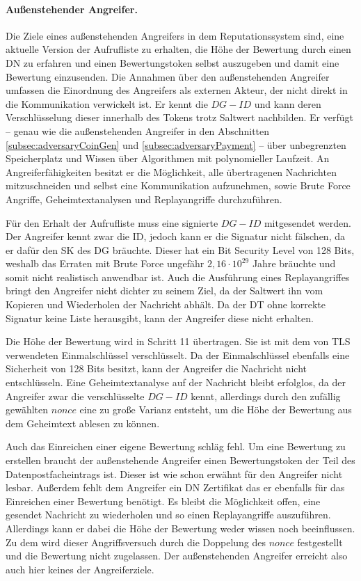 \documentclass[
	fontsize=11pt,
	headings=small,
	parskip=half,           %
	bibliography=totoc,
	numbers=noenddot,       %
	open=any,               %
]{scrreprt}
\begin{document}
\paragraph{Außenstehender Angreifer.}
Die Ziele eines außenstehenden Angreifers in dem Reputationssystem sind, eine aktuelle Version der Aufrufliste zu erhalten, die Höhe der Bewertung durch einen DN zu erfahren und einen Bewertungstoken selbst auszugeben und damit eine Bewertung einzusenden. Die Annahmen über den außenstehenden Angreifer umfassen die Einordnung des Angreifers als externen Akteur, der nicht direkt in die Kommunikation verwickelt ist. Er kennt die $DG-ID$ und kann deren Verschlüsselung dieser innerhalb des Tokens trotz Saltwert nachbilden. Er verfügt -- genau wie die außenstehenden Angreifer in den Abschnitten \ref{subsec:adversaryCoinGen} und \ref{subsec:adversaryPayment} -- über unbegrenzten Speicherplatz und Wissen über Algorithmen mit polynomieller Laufzeit. An Angreiferfähigkeiten besitzt er die Möglichkeit, alle übertragenen Nachrichten mitzuschneiden und selbst eine Kommunikation aufzunehmen, sowie Brute Force Angriffe, Geheimtextanalysen und Replayangriffe durchzuführen.

Für den Erhalt der Aufrufliste muss eine signierte $DG-ID$ mitgesendet werden. Der Angreifer kennt zwar die ID, jedoch kann er die Signatur nicht fälschen, da er dafür den SK des DG bräuchte. Dieser hat ein Bit Security Level von 128 Bits, weshalb das Erraten mit Brute Force ungefähr $2,16\cdot10^{29}$ Jahre bräuchte und somit nicht realistisch anwendbar ist. Auch die Ausführung eines Replayangriffes bringt den Angreifer nicht dichter zu seinem Ziel, da der Saltwert ihn vom Kopieren und Wiederholen der Nachricht abhält. Da der DT ohne korrekte Signatur keine Liste herausgibt, kann der Angreifer diese nicht erhalten.

Die Höhe der Bewertung wird in Schritt 11 übertragen. Sie ist mit dem von TLS verwendeten Einmalschlüssel verschlüsselt. Da der Einmalschlüssel ebenfalls eine Sicherheit von 128 Bits besitzt, kann der Angreifer die Nachricht nicht entschlüsseln. Eine Geheimtextanalyse auf der Nachricht bleibt erfolglos, da der Angreifer zwar die verschlüsselte $DG-ID$ kennt, allerdings durch den zufällig gewählten $nonce$ eine zu große Varianz entsteht, um die Höhe der Bewertung aus dem Geheimtext ablesen zu können.

Auch das Einreichen einer eigene Bewertung schläg fehl. Um eine Bewertung zu erstellen braucht der außenstehende Angreifer einen Bewertungstoken der Teil des Datenpostfacheintrags ist. Dieser ist wie schon erwähnt für den Angreifer nicht lesbar. Außerdem fehlt dem Angreifer ein DN Zertifikat das er ebenfalls für das Einreichen einer Bewertung benötigt. Es bleibt die Möglichkeit offen, eine gesendet Nachricht zu wiederholen und so einen Replayangriffe auszuführen. Allerdings kann er dabei die Höhe der Bewertung weder wissen noch beeinflussen. Zu dem wird dieser Angriffsversuch durch die Doppelung des $nonce$ festgestellt und die Bewertung nicht zugelassen. Der außenstehenden Angreifer erreicht also auch hier keines der Angreiferziele.\\
\end{document}
